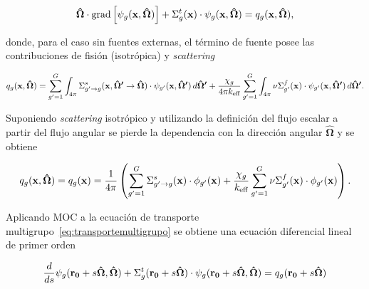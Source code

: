 \documentclass[11pt]{article}
\numberwithin{equation}{section}
\renewcommand{\vec}[1]{\ensuremath\mathbf{#1}}
\begin{document}
\begin{equation}
 \label{eq:transportemultigrupo}
 \boldsymbol{\hat{\Omega}} \cdot \text{grad} \left[ \psi_g(\vec{x}, \boldsymbol{\hat{\Omega}}) \right]
 + \Sigma^t_g(\vec{x}) \cdot \psi_g(\vec{x}, \boldsymbol{\hat{\Omega}}) = q_g(\vec{x}, \boldsymbol{\hat{\Omega}}),
\end{equation}

\noindent
donde, para el caso sin fuentes externas, el término de fuente posee las contribuciones de fisión (isotrópica) y \emph{scattering}

\begin{equation} \label{eq:fuentemultigrupo-1}
 q_g(\vec{x}, \boldsymbol{\hat{\Omega}}) =
 \sum_{g^\prime=1}^G \int_{4\pi} \Sigma^s_{g^\prime \rightarrow g}(\vec{x}, \boldsymbol{\hat{\Omega}^\prime} \rightarrow \boldsymbol{\hat{\Omega}}) \cdot \psi_{g^\prime}(\vec{x}, \boldsymbol{\hat{\Omega}^\prime}) \, d\boldsymbol{\hat{\Omega}^\prime} 
 + \frac{\chi_g}{4\pi k_{\text{eff}}} \sum_{g^\prime=1}^G \int_{4\pi} \nu\Sigma^f_{g^\prime}(\vec{x}) \cdot \psi_{g^\prime}(\vec{x}, \boldsymbol{\hat{\Omega}^\prime}) \, d\boldsymbol{\hat{\Omega}^\prime}.
\end{equation}

\noindent
Suponiendo \emph{scattering} isotrópico y utilizando la definición del flujo escalar a partir del flujo angular se pierde la dependencia con la dirección angular $\boldsymbol{\hat{\Omega}}$ y se obtiene

\begin{equation} \label{eq:fuentemultigrupo-2}
 q_g(\vec{x}, \boldsymbol{\hat{\Omega}}) = 
 q_g(\vec{x}) = 
 \frac{1}{4\pi} \left(
 \sum_{g^\prime=1}^G \Sigma^s_{g^\prime \rightarrow g}(\vec{x}) \cdot \phi_{g^\prime}(\vec{x})
 + \frac{\chi_g}{k_{\text{eff}}} \sum_{g^\prime=1}^G \nu\Sigma^f_{g^\prime}(\vec{x}) \cdot \phi_{g^\prime}(\vec{x}) 
 \right).
\end{equation}

Aplicando MOC a la ecuación de transporte multigrupo~\eqref{eq:transportemultigrupo} se obtiene una ecuación diferencial lineal de primer orden~\cite{glasstone,handbook-ingnuclear}

\begin{equation} \label{eq:caracteristica}
 \frac{d}{ds}\psi_g(\vec{r_0}+s\boldsymbol{\hat{\Omega}},\boldsymbol{\hat{\Omega}}) 
 + \Sigma^t_g(\vec{r_0}+s\boldsymbol{\hat{\Omega}}) \cdot \psi_g(\vec{r_0}+s\boldsymbol{\hat{\Omega}}, \boldsymbol{\hat{\Omega}}) = 
 q_g(\vec{r_0}+s\boldsymbol{\hat{\Omega}})
\end{equation}
\end{document}
